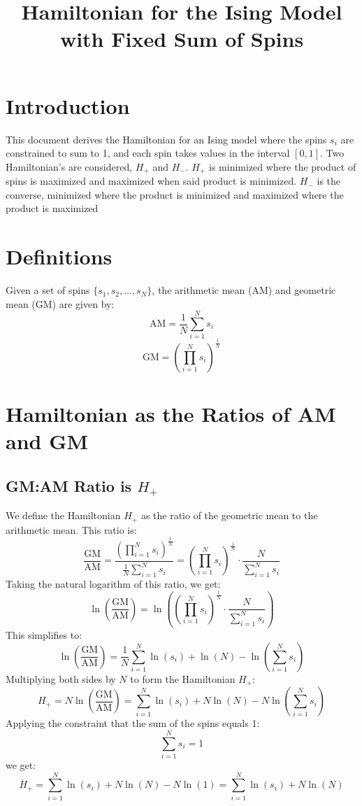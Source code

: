 \documentclass{article}
\begin{document}
\title{Hamiltonian for the Ising Model with Fixed Sum of Spins}
\author{}
\date{}
\maketitle
\tableofcontents

\section{Introduction}
This document derives the Hamiltonian for an Ising model where the spins \( s_i \) are constrained to sum to 1, and each spin takes values in the interval \([0,1]\). Two Hamiltonian's are considered, \(H_+\) and \(H_-\). \(H_+\) is minimized where the product of spins is maximized and maximized when said product is minimized. \(H_-\) is the converse, minimized where the product is minimized and maximized where the product is maximized

\section{Definitions}
Given a set of spins \( \{s_1, s_2, \ldots, s_N\} \), the arithmetic mean (AM) and geometric mean (GM) are given by:
\[
\text{AM} = \frac{1}{N} \sum_{i=1}^N s_i
\]
\[
\text{GM} = \left( \prod_{i=1}^N s_i \right)^{\frac{1}{N}}
\]

\section{Hamiltonian as the Ratios of AM and GM}
\subsection{GM:AM Ratio is \(H_+\)}
We define the Hamiltonian \( H_+ \) as the ratio of the geometric mean to the arithmetic mean. This ratio is:
\[
\frac{\text{GM}}{\text{AM}} = \frac{\left( \prod_{i=1}^N s_i \right)^{\frac{1}{N}}}{\frac{1}{N} \sum_{i=1}^N s_i} = \left( \prod_{i=1}^N s_i \right)^{\frac{1}{N}} \cdot \frac{N}{\sum_{i=1}^N s_i}
\]
Taking the natural logarithm of this ratio, we get:
\[
\ln\left( \frac{\text{GM}}{\text{AM}} \right) = \ln\left( \left( \prod_{i=1}^N s_i \right)^{\frac{1}{N}} \cdot \frac{N}{\sum_{i=1}^N s_i} \right)
\]
This simplifies to:
\[
\ln\left( \frac{\text{GM}}{\text{AM}} \right) = \frac{1}{N} \sum_{i=1}^N \ln(s_i) + \ln(N) - \ln\left( \sum_{i=1}^N s_i \right)
\]
Multiplying both sides by \( N \) to form the Hamiltonian \( H_+ \):
\[
H_+ = N \ln\left( \frac{\text{GM}}{\text{AM}} \right) = \sum_{i=1}^N \ln(s_i) + N \ln(N) - N \ln\left( \sum_{i=1}^N s_i \right)
\]
Applying the constraint that the sum of the spins equals 1:
\[
\sum_{i=1}^N s_i = 1
\]
we get:
\[
H_+ = \sum_{i=1}^N \ln(s_i) + N \ln(N) - N \ln(1) = \sum_{i=1}^N \ln(s_i) + N \ln(N)
\]
\end{document}
